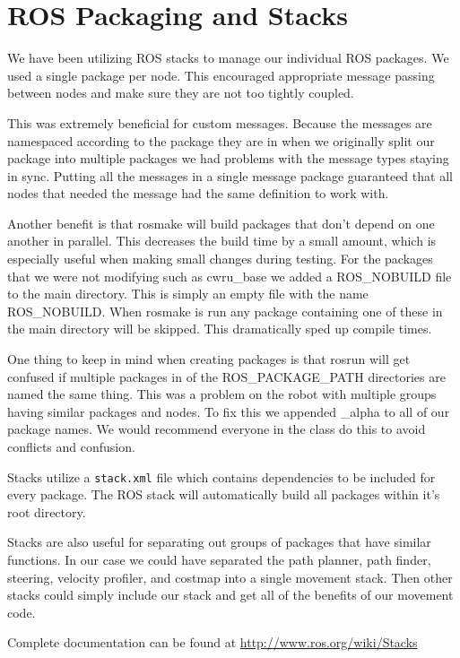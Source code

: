 \section{ROS Packaging and Stacks}

We have been utilizing ROS stacks to manage our individual ROS packages.
We used a single package per node. This encouraged
appropriate message passing between nodes and make sure they are not too
tightly coupled.

This was extremely beneficial for custom messages. Because the messages are namespaced according to the package they are in when we originally split our package into multiple packages we had problems with the message types staying in sync. Putting all the messages in a single message package guaranteed that all nodes that needed the message had the same definition to work with.

Another benefit is that rosmake will build packages that don't depend
on one another in parallel.  This decreases the build time by a small
amount, which is especially useful when making small changes during testing. For the packages that we were not modifying such as cwru\_base we added a ROS\_NOBUILD file to the main directory. This is simply an empty file with the name ROS\_NOBUILD. When rosmake is run any package containing one of these in the main directory will be skipped.  This dramatically sped up compile times.

One thing to keep in mind when creating packages is that rosrun will get confused if multiple packages in of the ROS\_PACKAGE\_PATH directories are named the same thing. This was a problem on the robot with multiple groups having similar packages and nodes. To fix this we appended \_alpha to all of our package names. We would recommend everyone in the class do this to avoid conflicts and confusion.

Stacks utilize a \texttt{stack.xml} file which contains dependencies to
be included for every package. The ROS stack will automatically build
all packages within it's root directory.

Stacks are also useful for separating out groups of packages that have similar functions.  In our case we could have separated the path planner, path finder, steering, velocity profiler, and costmap into a single movement stack. Then other stacks could simply include our stack and get all of the benefits of our movement code.

Complete documentation can be found at 
\url{http://www.ros.org/wiki/Stacks}
